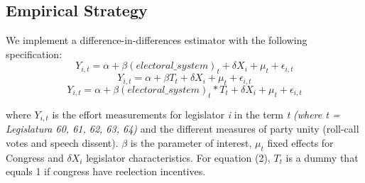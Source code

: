 \documentclass{article}
\begin{document}
\subsection*{Empirical Strategy}

We implement a difference-in-differences estimator with the following specification:
\begin{equation}
Y_{i, t} = \alpha + \beta (electoral\_system)_t + \delta X_i + \mu_t + \epsilon_{i, t}
\end{equation}
\begin{equation}
Y_{i, t} = \alpha + \beta T_t + \delta X_i  + \mu_t + \epsilon_{i, t}
\end{equation}
\begin{equation}
Y_{i, t} = \alpha + \beta (electoral\_system)_t * T_t  + \delta X_i  + \mu_t + \epsilon_{i, t}
\end{equation}

where $Y_{i, t}$ is the effort measurements for legislator \textit{i} in the term \textit{t} \textit{(where t = Legislatura 60, 61, 62, 63, 64)} and the different measures of party unity (roll-call votes and speech dissent). $\beta$ is the parameter of interest, $\mu_t$  fixed effects for Congress and $ \delta X_i $ legislator characteristics. For equation (2), $T_t$ is a dummy that equals 1 if congress have reelection incentives.  
\end{document}

